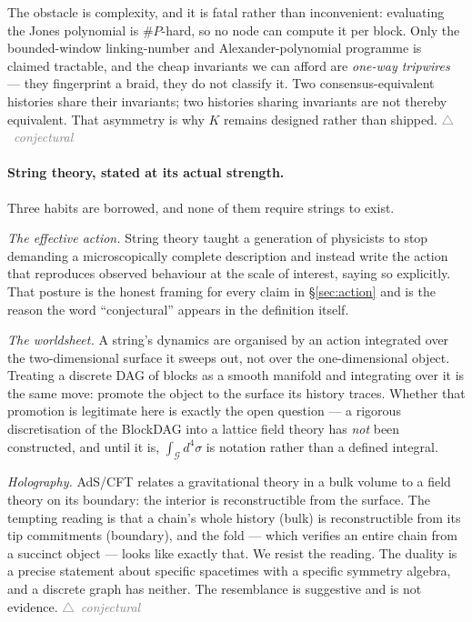 \documentclass[10pt,a4paper]{article}
\newcommand{\stC}{{\scriptsize\textcolor{gray}{$\triangle$~\textit{conjectural}}}}
\begin{document}
The obstacle is complexity, and it is fatal rather than inconvenient: evaluating the Jones
polynomial is $\#P$-hard, so no node can compute it per block. Only the bounded-window
linking-number and Alexander-polynomial programme is claimed tractable, and the cheap
invariants we can afford are \emph{one-way tripwires} --- they fingerprint a braid, they do
not classify it. Two consensus-equivalent histories share their invariants; two histories
sharing invariants are not thereby equivalent. That asymmetry is why $K$ remains designed
rather than shipped. \stC

\paragraph{String theory, stated at its actual strength.}
Three habits are borrowed, and none of them require strings to exist.

\emph{The effective action.} String theory taught a generation of physicists to stop
demanding a microscopically complete description and instead write the action that
reproduces observed behaviour at the scale of interest, saying so explicitly. That posture
is the honest framing for every claim in \S\ref{sec:action} and is the reason the word
``conjectural'' appears in the definition itself.

\emph{The worldsheet.} A string's dynamics are organised by an action integrated over the
two-dimensional surface it sweeps out, not over the one-dimensional object. Treating a
discrete DAG of blocks as a smooth manifold and integrating over it is the same move:
promote the object to the surface its history traces. Whether that promotion is legitimate
here is exactly the open question --- a rigorous discretisation of the BlockDAG into a
lattice field theory has \emph{not} been constructed, and until it is, $\int_{\mathcal{G}}
d^4\sigma$ is notation rather than a defined integral.

\emph{Holography.} AdS/CFT relates a gravitational theory in a bulk volume to a field theory
on its boundary: the interior is reconstructible from the surface. The tempting reading is
that a chain's whole history (bulk) is reconstructible from its tip commitments (boundary),
and the fold --- which verifies an entire chain from a succinct object --- looks like exactly
that. We resist the reading. The duality is a precise statement about specific spacetimes
with a specific symmetry algebra, and a discrete graph has neither. The resemblance is
suggestive and is not evidence. \stC
\end{document}
